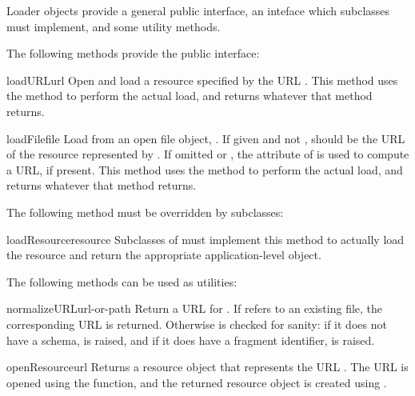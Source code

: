 \documentclass{howto}
\begin{document}
Loader objects provide a general public interface, an inteface which
subclasses must implement, and some utility methods.

The following methods provide the public interface:

\begin{methoddesc}[loader]{loadURL}{url}
  Open and load a resource specified by the URL .
  This method uses the  method to perform the
  actual load, and returns whatever that method returns.
\end{methoddesc}

\begin{methoddesc}[loader]{loadFile}{file}
  Load from an open file object, .  If given and not
  ,  should be the URL of the resource represented
  by .  If omitted or , the 
  attribute of  is used to compute a  URL, if
  present.
  This method uses the  method to perform the
  actual load, and returns whatever that method returns.
\end{methoddesc}

The following method must be overridden by subclasses:

\begin{methoddesc}[loader]{loadResource}{resource}
  Subclasses of  must implement this method to
  actually load the resource and return the appropriate
  application-level object.
\end{methoddesc}

The following methods can be used as utilities:

\begin{methoddesc}[loader]{normalizeURL}{url-or-path}
  Return a URL for .  If  refers to
  an existing file, the corresponding  URL is returned.
  Otherwise  is checked for sanity: if it
  does not have a schema,  is raised, and if it
  does have a fragment identifier,  is
  raised.
\end{methoddesc}

\begin{methoddesc}[loader]{openResource}{url}
  Returns a resource object that represents the URL .  The
  URL is opened using the  function, and
  the returned resource object is created using
  .
\end{methoddesc}
\end{document}

